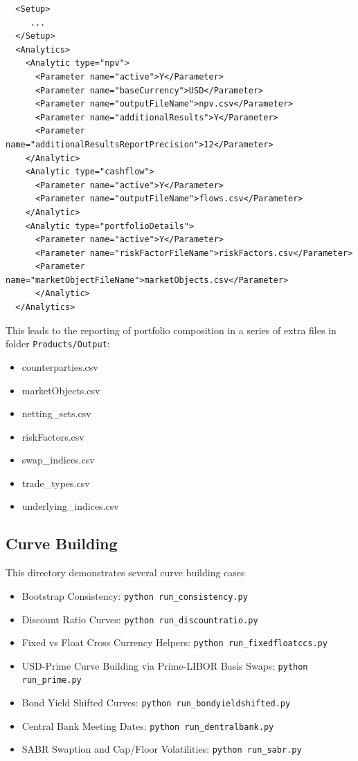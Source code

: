 \begin{verbatim}
  <Setup>
     ...
  </Setup>
  <Analytics>
    <Analytic type="npv">
      <Parameter name="active">Y</Parameter>
      <Parameter name="baseCurrency">USD</Parameter>
      <Parameter name="outputFileName">npv.csv</Parameter>
      <Parameter name="additionalResults">Y</Parameter>
      <Parameter name="additionalResultsReportPrecision">12</Parameter>
    </Analytic>
    <Analytic type="cashflow">
      <Parameter name="active">Y</Parameter>
      <Parameter name="outputFileName">flows.csv</Parameter>
    </Analytic>
    <Analytic type="portfolioDetails">
      <Parameter name="active">Y</Parameter>
      <Parameter name="riskFactorFileName">riskFactors.csv</Parameter>
      <Parameter name="marketObjectFileName">marketObjects.csv</Parameter>
      </Analytic>
  </Analytics>
\end{verbatim}

This leads to the reporting of portfolio composition in a series of extra files in folder {\tt Products/Output}:
\begin{itemize}
\item counterparties.csv
\item marketObjects.csv
\item netting\_sets.csv
\item riskFactors.csv
\item swap\_indices.csv
\item trade\_types.csv
\item underlying\_indices.csv
\end{itemize}

\subsection{Curve Building}

This directory demonstrates several curve building cases
\begin{itemize}
\item Bootstrap Consistency: {\tt python run\_consistency.py}
\item Discount Ratio Curves: {\tt python run\_discountratio.py}
\item Fixed vs Float Cross Currency Helpers: {\tt python run\_fixedfloatccs.py}
\item USD-Prime Curve Building via Prime-LIBOR Basis Swaps: {\tt python run\_prime.py}
\item Bond Yield Shifted Curves: {\tt python run\_bondyieldshifted.py}
\item Central Bank Meeting Dates: {\tt python run\_dentralbank.py}
\item SABR Swaption and Cap/Floor Volatilities: {\tt python run\_sabr.py}
\end{itemize}

